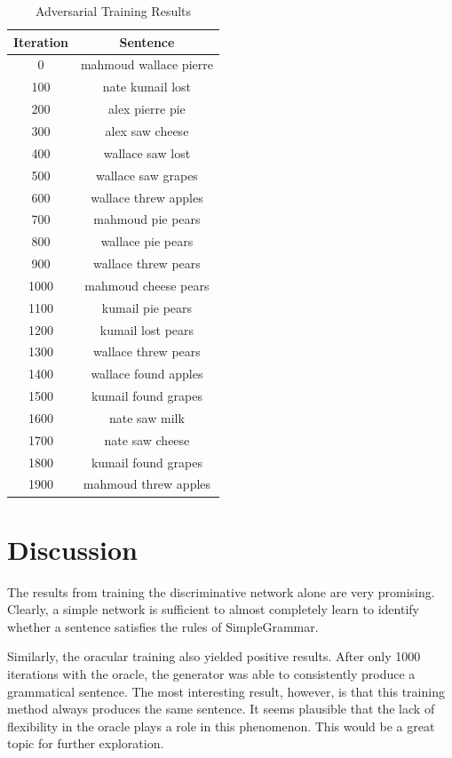 \documentclass[12pt]{article}
\begin{document}
\begin{table}[ht]
    \centering
    \begin{tabular}{c|c}
        Iteration & Sentence \\
        \hline
        0 & mahmoud wallace pierre \\
        100 & nate kumail lost \\
        200 & alex pierre pie \\
        300 & alex saw cheese \\
        400 & wallace saw lost \\
        500 & wallace saw grapes \\
        600 & wallace threw apples \\
        700 & mahmoud pie pears \\
        800 & wallace pie pears \\
        900 & wallace threw pears \\
        1000 & mahmoud cheese pears \\
        1100 & kumail pie pears \\
        1200 & kumail lost pears \\
        1300 & wallace threw pears \\
        1400 & wallace found apples \\
        1500 & kumail found grapes \\
        1600 & nate saw milk \\
        1700 & nate saw cheese \\
        1800 & kumail found grapes \\
        1900 & mahmoud threw apples \\
    \end{tabular}
    \caption{Adversarial Training Results}
    \label{tab:adversarial_results}
\end{table}


\section{Discussion}

The results from training the discriminative network alone are very promising. Clearly, a simple network is sufficient to almost completely learn to identify whether a sentence satisfies the rules of SimpleGrammar.

Similarly, the oracular training also yielded positive results. After only 1000 iterations with the oracle, the generator was able to consistently produce a grammatical sentence. The most interesting result, however, is that this training method always produces the same sentence. It seems plausible that the lack of flexibility in the oracle plays a role in this phenomenon. This would be a great topic for further exploration.
\end{document}
